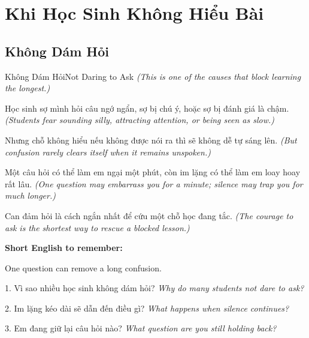 \chapter{Khi Học Sinh Không Hiểu Bài}

\section{Không Dám Hỏi}
\begin{truyen}{Không Dám Hỏi}{Not Daring to Ask}
\textit{(This is one of the causes that block learning the longest.)}

Học sinh sợ mình hỏi câu ngớ ngẩn, sợ bị chú ý, hoặc sợ bị đánh giá là chậm.
\textit{(Students fear sounding silly, attracting attention, or being seen as slow.)}

Nhưng chỗ không hiểu nếu không được nói ra thì sẽ không dễ tự sáng lên.
\textit{(But confusion rarely clears itself when it remains unspoken.)}

Một câu hỏi có thể làm em ngại một phút, còn im lặng có thể làm em loay hoay rất lâu.
\textit{(One question may embarrass you for a minute; silence may trap you for much longer.)}
\end{truyen}

\begin{baihoc}
Can đảm hỏi là cách ngắn nhất để cứu một chỗ học đang tắc.
\textit{(The courage to ask is the shortest way to rescue a blocked lesson.)}
\end{baihoc}

\begin{ghinhoanh}
\textbf{Short English to remember:}

One question can remove a long confusion.

\end{ghinhoanh}

\begin{tuhocnhanh}
1. Vì sao nhiều học sinh không dám hỏi? \textit{Why do many students not dare to ask?}

2. Im lặng kéo dài sẽ dẫn đến điều gì? \textit{What happens when silence continues?}

3. Em đang giữ lại câu hỏi nào? \textit{What question are you still holding back?}
\end{tuhocnhanh}
\ngancach

